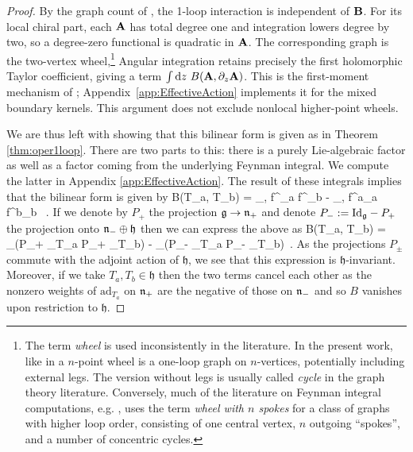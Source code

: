 \documentclass[11pt]{amsart}
\numberwithin{equation}{section}
\numberwithin{figure}{section}
\numberwithin{table}{section}
\begin{document}
\begin{proof}
	By the graph count of \cite[Sec.~1.2]{Gwilliam:2019cbp}, the 1-loop interaction is independent of $\mathbf{B}$.
	For its local chiral part, each $\mathbf{A}$ has total degree one and integration lowers degree by two, so a degree-zero functional is quadratic in $\mathbf{A}$.
	The corresponding graph is the two-vertex wheel,\footnote{The term \emph{wheel} is used inconsistently in the literature. In the present work, like in \cite{Gwilliam:2019cbp} a $n$-point wheel is a one-loop graph on $n$-vertices, potentially including external legs. The version without legs is usually called \emph{cycle} in the graph theory literature. Conversely, much of the literature on  Feynman integral computations, e.g. \cite{gurdogan_new_2016}, uses the term \emph{wheel with $n$ spokes} for a class of graphs with higher loop order, consisting of one central vertex, $n$ outgoing \enquote{spokes}, and a number of concentric cycles.  }
	Angular integration retains precisely the first holomorphic Taylor coefficient, giving a term $\int\mathrm{d} z~B(\mathbf{A},\partial_z\mathbf{A})$.
	This is the first-moment mechanism of \cite[Lemma~6.3]{Gwilliam:2019cbp}; Appendix~\ref{app:EffectiveAction} implements it for the mixed boundary kernels.
	This argument does not exclude nonlocal higher-point wheels.
	
	We are thus left with showing that this bilinear form is given as in Theorem \ref{thm:oper1loop}.
	There are two parts to this: there is a purely Lie-algebraic factor as well as a factor coming from the underlying Feynman integral.
	We compute the latter in Appendix \ref{app:EffectiveAction}.
	The result of these integrals implies that the bilinear form is given by
	\be
	B(T_a, T_b) =  \sum_{\alpha, \beta} f^\alpha_{a\beta} f^\beta_{b\alpha} -  \sum_{, } f^{\ol a}_{a } f^{\ol b}_{b }~.
	\ee
	If we denote by $P_+$ the projection $\mathfrak{g} \to \mathfrak{n}_+$ and denote $P_- := \mathrm{Id}_{\mathfrak{g}} - P_+$ the projection onto $\mathfrak{n}_- \oplus \mathfrak{h}$ then we can express the above as
	\be
	B(T_a, T_b) = \Tr_{\fg}(P_+ _{T_a} P_+ _{T_b}) - \Tr_{\fg}(P_- _{T_a} P_- _{T_b})~.
	\ee
	As the projections $P_\pm$ commute with the adjoint action of $\mathfrak{h}$, we see that this expression is $\mathfrak{h}$-invariant.
	Moreover, if we take $T_a, T_b \in \mathfrak{h}$ then the two terms cancel each other as the nonzero weights of $\mathrm{ad}_{T_a}$ on $\mathfrak{n}_+$ are the negative of those on $\mathfrak{n}_-$ and so $B$ vanishes upon restriction to $\mathfrak{h}$.
	

\end{proof}
\end{document}
